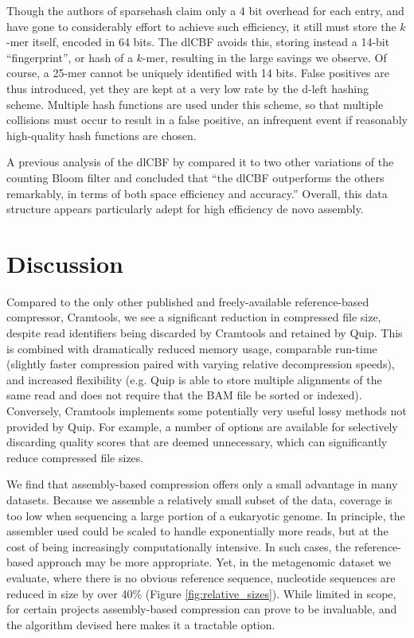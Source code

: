 \documentclass[a4,center,fleqn]{NAR}
\begin{document}
Though the authors of sparsehash claim only a 4 bit overhead for each entry,
and have gone to considerably effort to achieve such efficiency, it still must
store the $k$-mer itself, encoded in 64 bits. The dlCBF avoids this, storing
instead a 14-bit ``fingerprint'', or hash of a $k$-mer, resulting in the large
savings we observe. Of course, a 25-mer cannot be uniquely identified with 14
bits. False positives are thus introduced, yet they are kept at a very low
rate by the d-left hashing scheme. Multiple hash functions are used
under this scheme, so that multiple collisions must occur to result in a false
positive, an infrequent event if reasonably high-quality hash functions are
chosen.

A previous analysis of the dlCBF by \citet{Zhang2009} compared it to two other
variations of the counting Bloom filter and concluded that ``the dlCBF
outperforms the others remarkably, in terms of both space efficiency and
accuracy.'' Overall, this data structure appears particularly adept for high
efficiency de novo assembly.

\section{Discussion}

Compared to the only other published and freely-available reference-based
compressor, Cramtools, we see a significant reduction in compressed file size,
despite read identifiers being discarded by Cramtools and retained by Quip.
This is combined with dramatically reduced memory usage, comparable run-time
(slightly faster compression paired with varying relative decompression
speeds), and increased flexibility (e.g. Quip is able to store multiple
alignments of the same read and does not require that the BAM file be sorted
or indexed). Conversely, Cramtools implements some potentially very useful
lossy methods not provided by Quip. For example, a number of options are
available for selectively discarding quality scores that are deemed
unnecessary, which can significantly reduce compressed file sizes.

We find that assembly-based compression offers only a small advantage in many
datasets. Because we assemble a relatively small subset of the data, coverage
is too low when sequencing a large portion of a eukaryotic genome. In
principle, the assembler used could be scaled to handle exponentially more
reads, but at the cost of being increasingly computationally intensive. In
such cases, the reference-based approach may be more appropriate. Yet, in the
metagenomic dataset we evaluate, where there is no obvious reference sequence,
nucleotide sequences are reduced in size by over 40\% (Figure
\ref{fig:relative_sizes}). While limited in scope, for certain projects
assembly-based compression can prove to be invaluable, and the algorithm devised
here makes it a tractable option.
\end{document}
